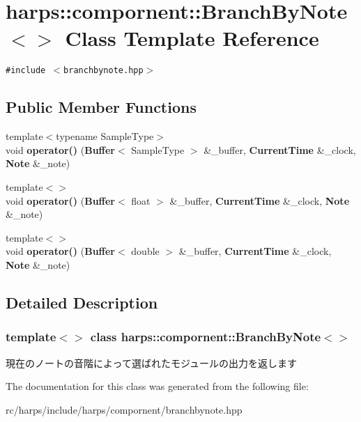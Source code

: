 \section{harps::compornent::BranchByNote$<$$>$ Class Template Reference}
\label{classharps_1_1compornent_1_1BranchByNote}
{\tt \#include $<$branchbynote.hpp$>$}

\subsection*{Public Member Functions}
\begin{CompactItemize}
\item 
{\footnotesize template$<$typename SampleType$>$ }\\void \textbf{operator()} ({\bf Buffer}$<$ SampleType $>$ \&\_\-buffer, {\bf CurrentTime} \&\_\-clock, {\bf Note} \&\_\-note)\label{classharps_1_1compornent_1_1BranchByNote_e542c236dad37cefaa100c942a3ceae4}

\item 
{\footnotesize template$<$$>$ }\\void \textbf{operator()} ({\bf Buffer}$<$ float $>$ \&\_\-buffer, {\bf CurrentTime} \&\_\-clock, {\bf Note} \&\_\-note)\label{classharps_1_1compornent_1_1BranchByNote_ac29b30924a4371c5923c3cdc19f9664}

\item 
{\footnotesize template$<$$>$ }\\void \textbf{operator()} ({\bf Buffer}$<$ double $>$ \&\_\-buffer, {\bf CurrentTime} \&\_\-clock, {\bf Note} \&\_\-note)\label{classharps_1_1compornent_1_1BranchByNote_33a993b8ef0143be5c2a281596a74122}

\end{CompactItemize}


\subsection{Detailed Description}
\subsubsection*{template$<$$>$ class harps::compornent::BranchByNote$<$$>$}

現在のノートの音階によって選ばれたモジュールの出力を返します 

The documentation for this class was generated from the following file:\begin{CompactItemize}
\item 
rc/harps/include/harps/compornent/branchbynote.hpp\end{CompactItemize}
